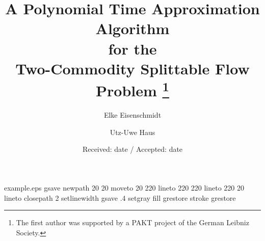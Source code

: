 \begin{filecontents*}{example.eps}
gsave
newpath
  20 20 moveto
  20 220 lineto
  220 220 lineto
  220 20 lineto
closepath
2 setlinewidth
gsave
  .4 setgray fill
grestore
stroke
grestore
\end{filecontents*}
\RequirePackage{fix-cm}
\documentclass{svjour3}
\def\makeheadbox{}
\smartqed
\usepackage{amsmath}
\usepackage{mathptmx}

\usepackage[utf8]{inputenc}
\usepackage{graphicx}
\usepackage{color}
\usepackage{datetime}

\usepackage{ifpdf}
\newcommand{\figinput}[1]{\ifpdf\else\fi}

\newtheorem{observation}{Observation}


\def\R{\mathbf{R}}
\def\Z{\mathbf{Z}}
\def\NP{{\ensuremath{\text{\textsc{NP}}}}}
\DeclareMathOperator{\conv}{conv}
\DeclareMathOperator{\dem}{dem}





\title{A Polynomial Time Approximation Algorithm\\ for the \\
  Two-Commodity Splittable Flow Problem
\thanks{The first author was supported by a PAKT project of the German
  Leibniz Society.}}
\author{Elke Eisenschmidt \and Utz-Uwe Haus}
\date{Received: date / Accepted: date}
\maketitle

\begin{abstract}
  We consider a generalization of the unsplittable maximum
  two-commodity flow problem on undirected graphs where each commodity
   can be split into a bounded number  of equally-sized chunks
  that can be routed on different paths. We show that in contrast to
  the single-commodity case this problem is \NP-hard, and hard to
  approximate to within a factor of . We
  present a polynomial time -approximation algorithm for the case
  of uniform chunk size over both commodities and show that for even
   and a mild cut condition it can be modified to yield an exact
  method. The uniform case can be used to derive a -approximation
  for the maximum concurrent -splittable flow without chunk
  size restrictions for fixed demand ratios.

\end{abstract}

